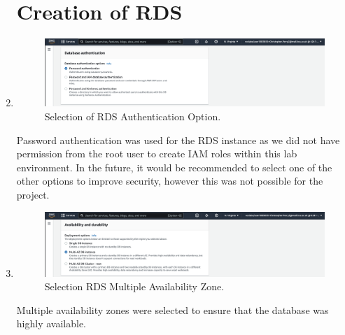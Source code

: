 \begin{enumerate}
    \section{Creation of RDS}\label{sec:creation-of-rds}

    \item
    \begin{figure}[H]
        \centering
        \includegraphics[width=\textwidth]{resources/rds/rds-authentication.png}
        \caption{Selection of RDS Authentication Option.}
        \label{fig:rds-auth}
    \end{figure}\nolinebreak
    \nolinebreak
    Password authentication was used for the RDS instance as we did not have permission from the root user to create IAM
    roles within this lab environment.
    In the future, it would be recommended to select one of the other options to improve security, however this was not
    possible for the project.

    \item
    \begin{figure}[H]
        \centering
        \includegraphics[width=\textwidth]{resources/rds/rds-availability-durability}
        \caption{Selection RDS Multiple Availability Zone.}
        \label{fig:rds-avail}
    \end{figure}\nolinebreak
    \nolinebreak
    Multiple availability zones were selected to ensure that the database was highly available.


\end{enumerate}
